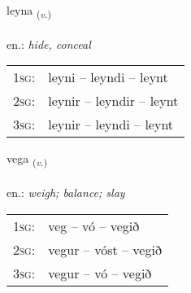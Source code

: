 \documentclass[frontgrid, backgrid]{flacards}\usepackage[]{graphicx}\usepackage[]{xcolor}
\begin{document}
\renewcommand{\blhead}{\vskip5pt {\small\bfseries\footnotesize Sagnorð | Verb }}
\renewcommand{\bcfoot}{\vskip5pt \hspace{2pt}{\small\bfseries\footnotesize 2K}}


{leyna \small{\textsubscript{(\textit{v.})}} \\[1ex] %
\textphonetic{[leiːna]} \\
en.: \emph{hide, conceal} \\  [2ex]
\renewcommand*{\arraystretch}{0.8}
\begin{tabular}{p{1cm}l}
\textsc{1sg}: & leyni -- leyndi -- leynt \\ 
\textsc{2sg}: & leynir -- leyndir -- leynt \\ 
\textsc{3sg}: & leynir -- leyndi -- leynt \\ 
\end{tabular}
}

\renewcommand{\flhead}{\vskip5pt \fboxsep=0pt {\small\bfseries\footnotesize Sagnorð | Verb}}
\renewcommand{\fcfoot}{\vskip5pt \fboxsep=0pt \hspace{2pt}{\small\bfseries\footnotesize 2K}}

\renewcommand{\blhead}{\vskip5pt {\small\bfseries\footnotesize Sagnorð | Verb }}
\renewcommand{\bcfoot}{\vskip5pt \hspace{2pt}{\small\bfseries\footnotesize 2K}}


{vega \small{\textsubscript{(\textit{v.})}} \\[1ex] %
\textphonetic{[vɛːɣa]} \\
en.: \emph{weigh; balance; slay} \\  [2ex]
\renewcommand*{\arraystretch}{0.8}
\begin{tabular}{p{1cm}l}
\textsc{1sg}: & veg -- vó -- vegið \\ 
\textsc{2sg}: & vegur -- vóst -- vegið \\ 
\textsc{3sg}: & vegur -- vó -- vegið \\ 
\end{tabular}
}
\end{document}
